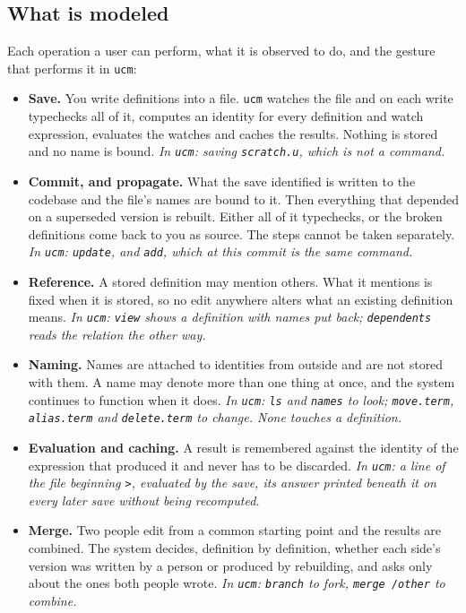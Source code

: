 \documentclass[11pt]{article}
\theoremstyle{definition}
\theoremstyle{plain}
\theoremstyle{remark}
\begin{document}
\subsection{What is modeled}

Each operation a user can perform, what it is observed to do, and the gesture that performs it in
\texttt{ucm}:

\begin{itemize}[nosep]
  \item \textbf{Save.} You write definitions into a file. \texttt{ucm} watches the file and on each
        write typechecks all of it, computes an identity for every definition and watch expression,
        evaluates the watches and caches the results. Nothing is stored and no name is bound.
        \emph{In \texttt{ucm}: saving \texttt{scratch.u}, which is not a command.}
  \item \textbf{Commit, and propagate.} What the save identified is written to the codebase and the
        file's names are bound to it. Then everything that depended on a superseded version is
        rebuilt. Either all of it typechecks, or the broken definitions come back to you as source.
        The steps cannot be taken separately. \emph{In \texttt{ucm}: \texttt{update}, and
        \texttt{add}, which at this commit is the same command.}
  \item \textbf{Reference.} A stored definition may mention others. What it mentions is fixed when it
        is stored, so no edit anywhere alters what an existing definition means. \emph{In
        \texttt{ucm}: \texttt{view} shows a definition with names put back; \texttt{dependents}
        reads the relation the other way.}
  \item \textbf{Naming.} Names are attached to identities from outside and are not stored with them.
        A name may denote more than one thing at once, and the system continues to function when it
        does. \emph{In \texttt{ucm}: \texttt{ls} and \texttt{names} to look; \texttt{move.term},
        \texttt{alias.term} and \texttt{delete.term} to change. None touches a definition.}
  \item \textbf{Evaluation and caching.} A result is remembered against the identity of the
        expression that produced it and never has to be discarded. \emph{In \texttt{ucm}: a line of
        the file beginning \texttt{>}, evaluated by the save, its answer printed beneath it on every
        later save without being recomputed.}
  \item \textbf{Merge.} Two people edit from a common starting point and the results are combined.
        The system decides, definition by definition, whether each side's version was written by a
        person or produced by rebuilding, and asks only about the ones both people wrote. \emph{In
        \texttt{ucm}: \texttt{branch} to fork, \texttt{merge /other} to combine.}
\end{itemize}
\end{document}
